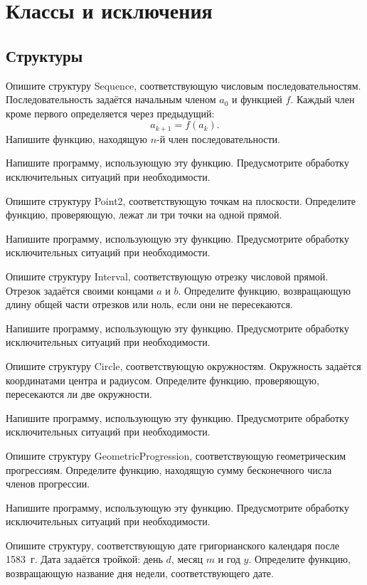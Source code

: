 \section{Классы и исключения}

\subsection{Структуры}

\task Опишите структуру Sequence, соответствующую числовым
последовательностям. Последовательность задаётся начальным членом
$a_0$ и функцией $f$. Каждый член кроме первого определяется через
предыдущий:
\[
a_{k+1} = f(a_k).
\]
Напишите функцию, находящую $n$-й член последовательности.

Напишите программу, использующую эту функцию. Предусмотрите обработку
исключительных ситуаций при необходимости.

\task Опишите структуру Point2, соответствующую точкам на
плоскости. Определите функцию, проверяющую, лежат ли три точки на
одной прямой.

Напишите программу, использующую эту функцию. Предусмотрите обработку
исключительных ситуаций при необходимости.

\task Опишите структуру Interval, соответствующую отрезку числовой
прямой. Отрезок задаётся своими концами $a$ и $b.$ Определите функцию,
возвращающую длину общей части отрезков или ноль, если они не
пересекаются.

Напишите программу, использующую эту функцию. Предусмотрите обработку
исключительных ситуаций при необходимости.

\task Опишите структуру Circle, соответствующую
окружностям. Окружность задаётся координатами центра и
радиусом. Определите функцию, проверяющую, пересекаются ли две
окружности.

Напишите программу, использующую эту функцию. Предусмотрите обработку
исключительных ситуаций при необходимости.

\task Опишите структуру GeometricProgression, соответствующую
геометрическим прогрессиям. Определите функцию, находящую сумму
бесконечного числа членов прогрессии.

Напишите программу, использующую эту функцию. Предусмотрите обработку
исключительных ситуаций при необходимости.

\task Опишите структуру, соответствующую дате григорианского календаря
после 1583~г. Дата задаётся тройкой: день $d$, месяц $m$ и год $y.$
Определите функцию, возвращающую название дня недели, соответствующего
дате.

